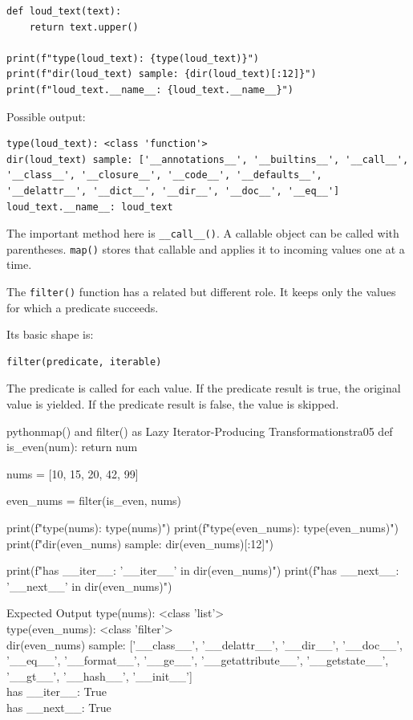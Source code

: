 \begin{verbatim}
def loud_text(text):
    return text.upper()

print(f"type(loud_text): {type(loud_text)}")
print(f"dir(loud_text) sample: {dir(loud_text)[:12]}")
print(f"loud_text.__name__: {loud_text.__name__}")
\end{verbatim}

Possible output:

\begin{verbatim}
type(loud_text): <class 'function'>
dir(loud_text) sample: ['__annotations__', '__builtins__', '__call__',
'__class__', '__closure__', '__code__', '__defaults__',
'__delattr__', '__dict__', '__dir__', '__doc__', '__eq__']
loud_text.__name__: loud_text
\end{verbatim}

The important method here is \texttt{\_\_call\_\_()}. A callable object can be called with parentheses. \texttt{map()} stores that callable and applies it to incoming values one at a time.

The \texttt{filter()} function has a related but different role. It keeps only the values for which a predicate succeeds.

Its basic shape is:

\begin{verbatim}
filter(predicate, iterable)
\end{verbatim}

The predicate is called for each value. If the predicate result is true, the original value is yielded. If the predicate result is false, the value is skipped.

\begin{codebox}[]{python}{map() and filter() as Lazy Iterator-Producing Transformations}{tra05}
def is_even(num):
    return num %

nums = [10, 15, 20, 42, 99]

even_nums = filter(is_even, nums)

print(f"type(nums): {type(nums)}")
print(f"type(even_nums): {type(even_nums)}")
print(f"dir(even_nums) sample: {dir(even_nums)[:12]}")

print(f"has __iter__: {'__iter__' in dir(even_nums)}")
print(f"has __next__: {'__next__' in dir(even_nums)}")
\end{codebox}


\begin{iobox}{Expected Output}
type(nums): <class 'list'> \\
type(even\_nums): <class 'filter'> \\
dir(even\_nums) sample: ['\_\_class\_\_', '\_\_delattr\_\_', '\_\_dir\_\_', '\_\_doc\_\_', \\
'\_\_eq\_\_', '\_\_format\_\_', '\_\_ge\_\_', '\_\_getattribute\_\_', '\_\_getstate\_\_', \\
'\_\_gt\_\_', '\_\_hash\_\_', '\_\_init\_\_'] \\
has \_\_iter\_\_: True \\
has \_\_next\_\_: True \\
\end{iobox}




